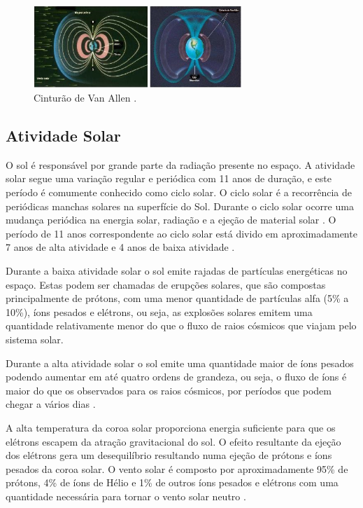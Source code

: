 \begin{figure}
	\centering
	\includegraphics[width=0.7\textwidth]{figuras/cinturao.jpg}
	\caption[Cinturão de Van Allen]{Cinturão de Van Allen \cite{cinturao}.}
	\label{Img:cinturaoVanAllen}	
\end{figure}

\subsection{Atividade Solar}

O sol é responsável por grande parte da radiação presente no espaço. A atividade solar segue uma variação regular e periódica com 11 anos de duração, e este período é comumente conhecido como ciclo solar. O ciclo solar é a recorrência de periódicas manchas solares na superfície do Sol. Durante o ciclo solar ocorre uma mudança periódica na energia solar, radiação e a ejeção de material solar \cite{Mansoori:2013}. O período de 11 anos correspondente ao ciclo solar está divido em aproximadamente 7 anos de alta atividade e 4 anos de baixa atividade \cite{Boudenot:2007}. 

Durante a baixa atividade solar o sol emite rajadas de partículas energéticas no espaço. Estas podem ser chamadas de erupções solares, que são compostas principalmente de prótons, com uma menor quantidade de partículas alfa (5\% a 10\%), íons pesados e elétrons, ou seja, as explosões solares emitem uma quantidade relativamente menor do que o fluxo de raios cósmicos que viajam pelo sistema solar.

Durante a alta atividade solar o sol emite uma quantidade maior de íons pesados podendo aumentar em até quatro ordens de grandeza, ou seja, o fluxo de íons é maior do que os observados para os raios cósmicos, por períodos que podem chegar a vários dias \cite{Stassinopoulos:1988}. 

A alta temperatura da coroa solar proporciona energia suficiente para que os elétrons escapem da atração gravitacional do sol. O efeito resultante da ejeção dos elétrons gera um desequilíbrio resultando numa ejeção de prótons e íons pesados da coroa solar. O vento solar é composto por aproximadamente 95\% de prótons, 4\% de íons de Hélio e 1\% de outros íons pesados e elétrons com uma quantidade necessária para tornar o vento solar neutro \cite{Velazco:2007}. 



